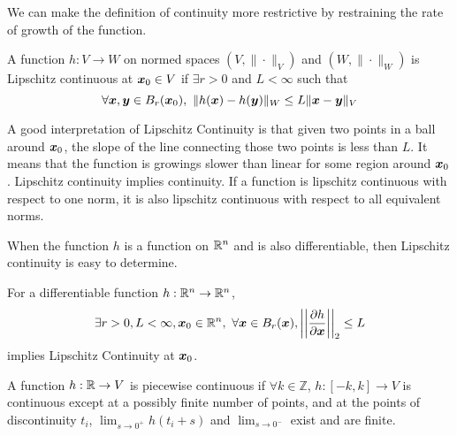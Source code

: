 We can make the definition of continuity more restrictive by restraining the
rate of growth of the function.
\begin{definition}
	A function $h:V\to W$ on normed spaces $(V, \|\cdot\|_V)$ and $(W,
	\|\cdot\|_W)$ is Lipschitz continuous at $\boldsymbol{x}_0\in V$ if $\exists r > 0$
	and $L < \infty$ such that \[
		\forall \boldsymbol{x}, \boldsymbol{y}\in B_r(\boldsymbol{x}_0),\ \|h(\boldsymbol{x}) - h(\boldsymbol{y})\|_W \leq L
		\|\boldsymbol{x} - \boldsymbol{y}\|_V
	\]
	\label{defn:lipschitz-continuity}
\end{definition}
A good interpretation of Lipschitz Continuity is that given two points in a ball
around $\boldsymbol{x}_0$, the slope of the line connecting those two points is less
than $L$. It means that the function is growings slower than linear for some
region around $\boldsymbol{x}_0$. Lipschitz continuity implies continuity. If a function
is lipschitz continuous with respect to one norm, it is also lipschitz
continuous with respect to all equivalent norms.

When the function $h$ is a function on $\mathbb{R}^n$ and is also
differentiable, then Lipschitz continuity is easy to determine.
\begin{theorem}
	For a differentiable function $h:\mathbb{R}^n\to\mathbb{R}^n$, \[
		\exists r>0, L < \infty, \bs{x}_0\in\R^n,\ \forall \bs{x}\in B_r(\bs{x}),
		\left\lvert\left\lvert\frac{\partial h}{\partial
		\bs{x}}\right\rvert\right\rvert_2 \leq L
	\] implies Lipschitz Continuity at $\boldsymbol{x}_0$.
	\label{thm:differentiable-lipschitz}
\end{theorem}
\begin{definition}
	A function $h:\mathbb{R}\to V$ is piecewise continuous if $\forall k\in \mathbb{Z}$,
	$h:[-k, k] \to V$ is continuous except at a possibly finite number of points,
	and at the points of discontinuity $t_i$, $\lim_{s\to0^+} h(t_i+s)$ and
	$\lim_{s\to0^-}$ exist and are finite. 
	\label{defn:piecewise-continuous}
\end{definition}
